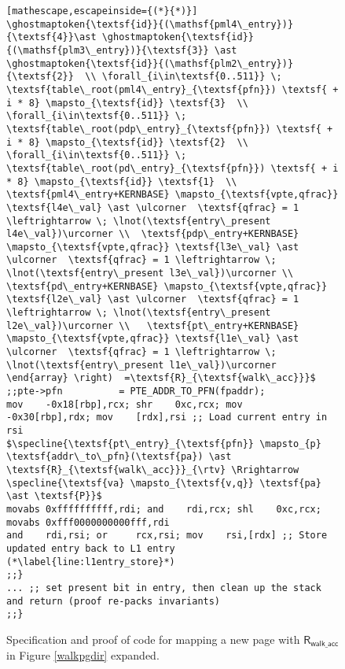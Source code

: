 \begin{figure}
\begin{lstlisting}[mathescape,escapeinside={(*}{*)}]
\ghostmaptoken{\textsf{id}}{(\mathsf{pml4\_entry})}{\textsf{4}}\ast \ghostmaptoken{\textsf{id}}{(\mathsf{plm3\_entry})}{\textsf{3}} \ast \ghostmaptoken{\textsf{id}}{(\mathsf{plm2\_entry})}{\textsf{2}}  \\ \forall_{i\in\textsf{0..511}} \; \textsf{table\_root(pml4\_entry}_{\textsf{pfn}}) \textsf{ + i * 8} \mapsto_{\textsf{id}} \textsf{3}  \\ \forall_{i\in\textsf{0..511}} \; \textsf{table\_root(pdp\_entry}_{\textsf{pfn}}) \textsf{ + i * 8} \mapsto_{\textsf{id}} \textsf{2}  \\ \forall_{i\in\textsf{0..511}} \; \textsf{table\_root(pd\_entry}_{\textsf{pfn}}) \textsf{ + i * 8} \mapsto_{\textsf{id}} \textsf{1}  \\  \textsf{pml4\_entry+KERNBASE} \mapsto_{\textsf{vpte,qfrac}} \textsf{l4e\_val} \ast \ulcorner  \textsf{qfrac} = 1 \leftrightarrow \; \lnot(\textsf{entry\_present l4e\_val})\urcorner \\  \textsf{pdp\_entry+KERNBASE} \mapsto_{\textsf{vpte,qfrac}} \textsf{l3e\_val} \ast \ulcorner  \textsf{qfrac} = 1 \leftrightarrow \; \lnot(\textsf{entry\_present l3e\_val})\urcorner \\  \textsf{pd\_entry+KERNBASE} \mapsto_{\textsf{vpte,qfrac}} \textsf{l2e\_val} \ast \ulcorner  \textsf{qfrac} = 1 \leftrightarrow \; \lnot(\textsf{entry\_present l2e\_val})\urcorner \\   \textsf{pt\_entry+KERNBASE} \mapsto_{\textsf{vpte,qfrac}} \textsf{l1e\_val} \ast \ulcorner  \textsf{qfrac} = 1 \leftrightarrow \; \lnot(\textsf{entry\_present l1e\_val})\urcorner    \end{array} \right)  =\textsf{R}_{\textsf{walk\_acc}}}$
;;pte->pfn          = PTE_ADDR_TO_PFN(fpaddr);
mov    -0x18[rbp],rcx; shr    0xc,rcx; mov    -0x30[rbp],rdx; mov    [rdx],rsi ;; Load current entry in rsi
$\specline{\textsf{pt\_entry}_{\textsf{pfn}} \mapsto_{p} \textsf{addr\_to\_pfn}(\textsf{pa}) \ast \textsf{R}_{\textsf{walk\_acc}}}_{\rtv} \Rrightarrow \specline{\textsf{va} \mapsto_{\textsf{v,q}} \textsf{pa} \ast \textsf{P}}$
movabs 0xffffffffff,rdi; and    rdi,rcx; shl    0xc,rcx; movabs 0xfff0000000000fff,rdi
and    rdi,rsi; or     rcx,rsi; mov    rsi,[rdx] ;; Store updated entry back to L1 entry (*\label{line:l1entry_store}*)
;;}
... ;; set present bit in entry, then clean up the stack and return (proof re-packs invariants)
;;}
\end{lstlisting}
\vspace{-1em}
  \caption{Specification and proof of code for mapping a new page with $\textsf{R}_{\textsf{walk\_acc}}$ in Figure \ref{walkpgdir} expanded.}
\label{fig:mapping_code}
\end{figure}

